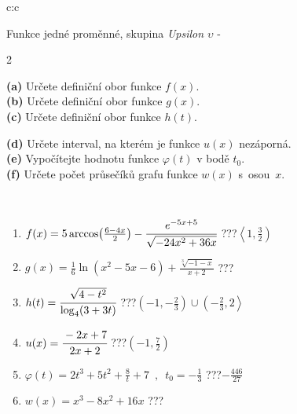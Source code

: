 \documentclass[10pt]{report}
\begin{document}
\begin{tabular}{c:c}
\begin{minipage}[c][104.5mm][t]{0.5\linewidth}
\begin{center}
\vspace{7mm}
{\huge Funkce jedné proměnné, skupina \textit{Upsilon $\upsilon$} -}\\[5mm]
\begin{minipage}{0.95\linewidth}
\begin{center}
{\small \begin{multicols}{2} \raggedright
\textbf{(a)} Určete definiční obor funkce \(f(x)\). \\[1mm]
\textbf{(b)} Určete definiční obor funkce \(g(x)\). \\[1mm]
\textbf{(c)} Určete definiční obor funkce \(h(t)\). \par \columnbreak
\textbf{(d)} Určete interval, na kterém je funkce \(u(x)\) nezáporná. \\[1mm]
\textbf{(e)} Vypočítejte hodnotu funkce \(\varphi(t)\) v bodě \(t_0\). \\[1mm]
\textbf{(f)} Určete počet průsečíků grafu funkce \(w(x)\) s~osou~\(x\). \\[1mm]
\end{multicols}
}
\end{center}
\end{minipage}
\\[4mm]
\begin{minipage}{0.79\linewidth}
\begin{center}
\begin{varwidth}{\linewidth}
\begin{enumerate}
\small
\item $f(x) = 5\arccos\!\left( \frac{6-4x}{2} \right) - \cfrac{e^{-5x+5}}{\sqrt{-24x^2+36x}}$\quad \dotfill\; ???\;\dotfill \quad $\left\langle1 , \frac{3}{2}\right)$
\item $g(x) = \frac{1}{6} \ln{\!(x^2-5x-6)}+\frac{\sqrt[3]{-1-x}}{x+2}$\quad \dotfill\; ???\;\dotfill {}
\item $h(t) = \cfrac{\sqrt{4-t^2}}{\log_4(3+3t)}$\quad \dotfill\; ???\;\dotfill \quad $\left(-1 , -\frac{2}{3}\right)\cup\left(-\frac{2}{3} , 2\right\rangle$
\item $u(x) = \cfrac{-2x+7}{2x+2}$\quad \dotfill\; ???\;\dotfill \quad $\left(-1 , \frac{7}{2}\right)$
\item $\varphi(t) = 2t^3+5t^2+\frac{8}{t}+7 \enspace , \enspace t_0=-\frac{1}{3}$\quad \dotfill\; ???\;\dotfill \quad $-\frac{446}{27}$
\item $w(x) = x^3-8x^2+16x$\quad \dotfill\; ???\;\dotfill {}

\end{enumerate}
\end{varwidth}
\end{center}
\end{minipage}
\end{center}
\end{minipage}
\end{tabular}
\end{document}
